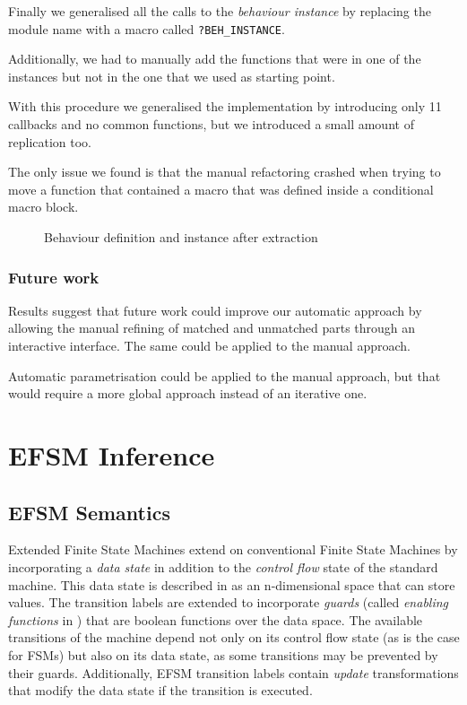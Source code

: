 Finally we generalised all the calls to the \emph{behaviour instance} by 
replacing the module name with a macro called \texttt{?BEH\_INSTANCE}.

Additionally, we had to manually add the functions that were in one of the 
instances but not in the one that we used as starting point.

With this procedure we generalised the implementation by introducing only 11 
callbacks and no common functions, but we introduced a small amount of 
replication too.

The only issue we found is that the manual refactoring crashed when trying to 
move a function that contained a macro that was defined inside a conditional 
macro block.

\begin{figure}[t]
%
\vspace*{-2.5mm}
\caption{Behaviour definition and instance after extraction\label{fig:auto-abs}}
\end{figure}

\subsubsection{Future work}

Results suggest that future work could improve our automatic approach by 
allowing the manual refining of matched and unmatched parts through an 
interactive interface. The same could be applied to the manual approach.

Automatic parametrisation could be applied to the manual approach, but that 
would require a more global approach instead of an iterative one.

\section{EFSM Inference}
\label{EFSMInference}

\subsection{EFSM Semantics}
\label{EFSMSemantics}

Extended Finite State Machines extend on conventional Finite State Machines by incorporating a \emph{data state} in addition to the \emph{control flow} state of the standard machine. This data state is described in \cite{EFSMs} as an n-dimensional space that can store values. The transition labels are extended to incorporate \emph{guards} (called \emph{enabling functions} in \cite{EFSMs}) that are boolean functions over the data space. The available transitions of the machine depend not only on its control flow state (as is the case for FSMs) but also on its data state, as some transitions may be prevented by their guards. Additionally, EFSM transition labels contain \emph{update} transformations that modify the data state if the transition is executed. 

